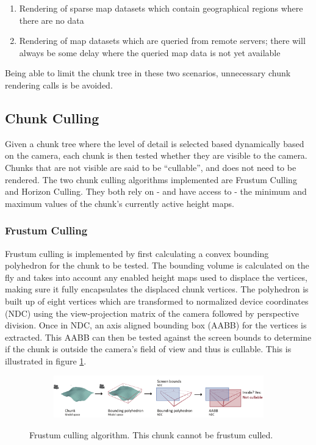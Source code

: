 \begin{enumerate}
\item Rendering of sparse map datasets which contain geographical regions where there are no data
\item Rendering of map datasets which are queried from remote servers; there will always be some delay where the queried map data is not yet available
\end{enumerate}

Being able to limit the chunk tree in these two scenarios, unnecessary chunk rendering calls is be avoided.

\subsection{Chunk Culling}
Given a chunk tree where the level of detail is selected based dynamically based on the camera, each chunk is then tested whether they are visible to the camera. Chunks that are not visible are said to be ``cullable'', and does not need to be rendered. The two chunk culling algorithms implemented are Frustum Culling and Horizon Culling. They both rely on - and have access to - the minimum and maximum values of the chunk's currently active height maps. 

\subsubsection{Frustum Culling}
Frustum culling is implemented by first calculating a convex bounding polyhedron for the chunk to be tested. The bounding volume is calculated on the fly and takes into account any enabled height maps used to displace the vertices, making sure it fully encapsulates the displaced chunk vertices. The polyhedron is built up of eight vertices which are transformed to normalized device coordinates (NDC) using the view-projection matrix of the camera followed by perspective division. Once in NDC, an axis aligned bounding box (AABB) for the vertices is extracted. This AABB can then be tested against the screen bounds to determine if the chunk is outside the camera's field of view and thus is cullable. This is illustrated in figure \ref{fig:frustumculling}.

\begin{figure}[htbp]
    \centering
    \begin{subfigure}[bt]{1.0\textwidth}
        \includegraphics[width=\textwidth]{figures/implementation/chunklod/frustumculling.pdf}
    \end{subfigure}
    \caption{Frustum culling algorithm. This chunk cannot be frustum culled.}
    \label{fig:frustumculling}
\end{figure}


